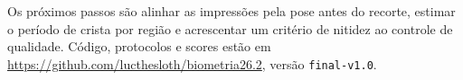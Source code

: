\documentclass[conference]{IEEEtran}
\newcommand{\repourl}{\url{https://github.com/lucthesloth/biometria26.2}}
\newcommand{\repoversion}{final-v1.0}
\begin{document}
Os próximos passos são alinhar as impressões pela pose antes do recorte, estimar o período de crista por região e acrescentar um critério de nitidez ao controle de qualidade. Código, protocolos e scores estão em \repourl, versão \texttt{\repoversion}.



\end{document}
